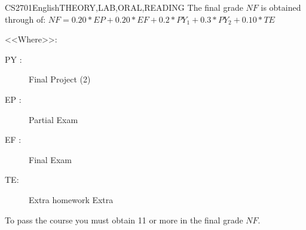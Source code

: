 \begin{evaluation}{CS2701}{English}{THEORY,LAB,ORAL,READING}
The final grade $NF$ is obtained through of:
$ NF = 0.20*EP + 0.20*EF + 0.2*PY_{1} + 0.3*PY_{2} + 0.10*TE $

\noindent <<Where>>:
\begin{description}
	\item[PY :] Final Project (2)
	\item[EP :] Partial Exam
	\item[EF :] Final Exam
	\item[TE:] Extra homework Extra
\end{description}
\noindent To pass the course you must obtain 11 or more in the final grade $NF$.
\end{evaluation}

